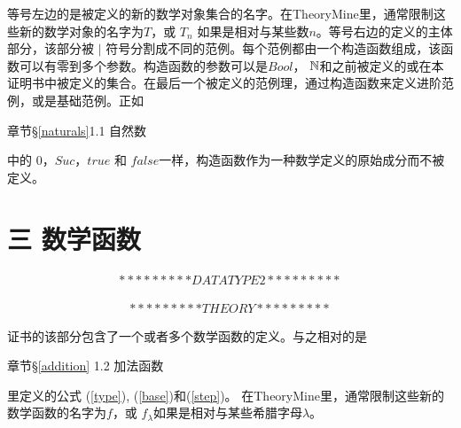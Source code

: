 \documentclass[twocolumn]{article}
\begin{document}
\begin{CJK}{UTF8}{gbsn}

\indent \indent 等号左边的是被定义的新的数学对象集合的名字。在TheoryMine里，通常限制这些新的数学对象的名字为$T$，或 $T_n$ 如果是相对与某些数$n$。等号右边的定义的主体部分，该部分被 $|$ 符号分割成不同的范例。每个范例都由一个构造函数组成，该函数可以有零到多个参数。构造函数的参数可以是$Bool$， $\mathbb{N}$和之前被定义的或在本证明书中被定义的集合。在最后一个被定义的范例理，通过构造函数来定义进阶范例，或是基础范例。正如\begin{CJK}{UTF8}{gkai}章节\S\ref{naturals}1.1 自然数\end{CJK}中的 $0$，$Suc$，$true$ 和 $false$一样，构造函数作为一种数学定义的原始成分而不被定义。



\section*{三 数学函数}
\label{functions}

\begin{eqnarray*}
*********DATA TYPE2*********
\end{eqnarray*}

\begin{eqnarray*}
*********THEORY*********
\end{eqnarray*}

\indent \indent 证书的该部分包含了一个或者多个数学函数的定义。与之相对的是\begin{CJK}{UTF8}{gkai}章节\S\ref{addition} 1.2 加法函数\end{CJK}里定义的公式 (\ref{type}), (\ref{base})和(\ref{step})。 在TheoryMine里，通常限制这些新的数学函数的名字为$f$，或 $f_{\lambda}$如果是相对与某些希腊字母$\lambda$。\\


\end{CJK}
\end{document}
